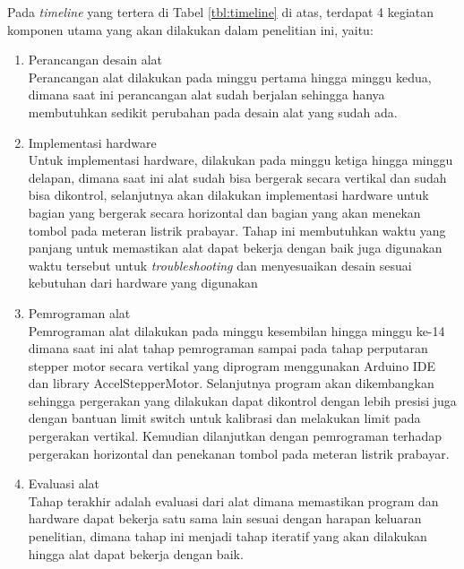 Pada \emph{timeline} yang tertera di Tabel \ref{tbl:timeline} di atas, terdapat 4 kegiatan komponen utama yang akan dilakukan dalam penelitian ini, yaitu:
\begin{enumerate}
  \item Perancangan desain alat\\
  Perancangan alat dilakukan pada minggu pertama hingga minggu kedua, dimana saat ini perancangan alat sudah berjalan sehingga hanya membutuhkan
  sedikit perubahan pada desain alat yang sudah ada.
  \item Implementasi hardware\\
  Untuk implementasi hardware, dilakukan pada minggu ketiga hingga minggu delapan, dimana saat ini alat sudah bisa bergerak secara vertikal dan sudah bisa dikontrol,
  selanjutnya akan dilakukan implementasi hardware untuk bagian yang bergerak secara horizontal dan bagian yang akan menekan tombol pada meteran listrik prabayar.
  Tahap ini membutuhkan waktu yang panjang untuk memastikan alat dapat bekerja dengan baik juga digunakan waktu tersebut
  untuk \textit{troubleshooting} dan menyesuaikan desain sesuai kebutuhan dari hardware yang digunakan
  \item Pemrograman alat\\
  Pemrograman alat dilakukan pada minggu kesembilan hingga minggu ke-14 dimana saat ini alat
  tahap pemrograman sampai pada tahap perputaran stepper motor secara vertikal yang diprogram
  menggunakan Arduino IDE dan library AccelStepperMotor. Selanjutnya program akan dikembangkan sehingga pergerakan yang dilakukan
  dapat dikontrol dengan lebih presisi juga dengan bantuan limit switch untuk kalibrasi dan melakukan limit pada pergerakan vertikal.
  Kemudian dilanjutkan dengan pemrograman terhadap pergerakan horizontal dan penekanan tombol pada meteran listrik prabayar.
  \item Evaluasi alat\\
  Tahap terakhir adalah evaluasi dari alat dimana memastikan program dan hardware dapat bekerja satu sama lain
  sesuai dengan harapan keluaran penelitian, dimana tahap ini menjadi tahap iteratif yang akan dilakukan hingga alat dapat bekerja dengan baik.
\end{enumerate}
